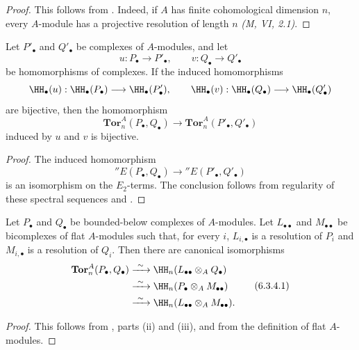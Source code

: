 \begin{proof}
This follows from .  Indeed, if $A$ has finite
cohomological dimension $n$, every $A$-module has a projective
resolution of length $n$ \emph{(M, VI, 2.1)}.
\end{proof}

\begin{corollary}[6.3.3]
\label{III.6.3.3}
Let $P'_\bullet$ and $Q'_\bullet$ be complexes of $A$-modules, and
let
\[
  u:P_\bullet\to P'_\bullet,
  \qquad
  v:Q_\bullet\to Q'_\bullet
\]
be homomorphisms of complexes.  If the induced homomorphisms
\[
  \HH_\bullet(u):
  \HH_\bullet(P_\bullet)\longrightarrow\HH_\bullet(P'_\bullet),
  \qquad
  \HH_\bullet(v):
  \HH_\bullet(Q_\bullet)\longrightarrow\HH_\bullet(Q'_\bullet)
\]
are bijective, then the homomorphism
\[
  \mathbf{Tor}_n^A(P_\bullet,Q_\bullet)
  \longrightarrow
  \mathbf{Tor}_n^A(P'_\bullet,Q'_\bullet)
\]
induced by $u$ and $v$ is bijective.
\end{corollary}

\begin{proof}
The induced homomorphism
\[
  ''E(P_\bullet,Q_\bullet)
  \longrightarrow
  ''E(P'_\bullet,Q'_\bullet)
\]
is an isomorphism on the $E_2$-terms.  The conclusion follows from
regularity of these spectral sequences  and
.
\end{proof}

\begin{proposition}[6.3.4]
\label{III.6.3.4}
Let $P_\bullet$ and $Q_\bullet$ be bounded-below complexes of
$A$-modules.  Let $L_{\bullet\bullet}$ and
$M_{\bullet\bullet}$ be bicomplexes of flat $A$-modules such that,
for every $i$, $L_{i,\bullet}$ is a resolution of $P_i$ and
$M_{i,\bullet}$ is a resolution of $Q_i$.  Then there are canonical
isomorphisms
\[
  \begin{split}
  \mathbf{Tor}_n^A(P_\bullet,Q_\bullet)
  &\xrightarrow{\ \sim\ }
  \HH_n(L_{\bullet\bullet}\otimes_AQ_\bullet)\\
  &\xrightarrow{\ \sim\ }
  \HH_n(P_\bullet\otimes_AM_{\bullet\bullet})\\
  &\xrightarrow{\ \sim\ }
  \HH_n(L_{\bullet\bullet}\otimes_AM_{\bullet\bullet}).
  \end{split}
  \tag{6.3.4.1}\label{III.6.3.4.1}
\]
\end{proposition}

\begin{proof}
This follows from , parts (ii) and (iii), and
from the definition of flat $A$-modules.
\end{proof}

